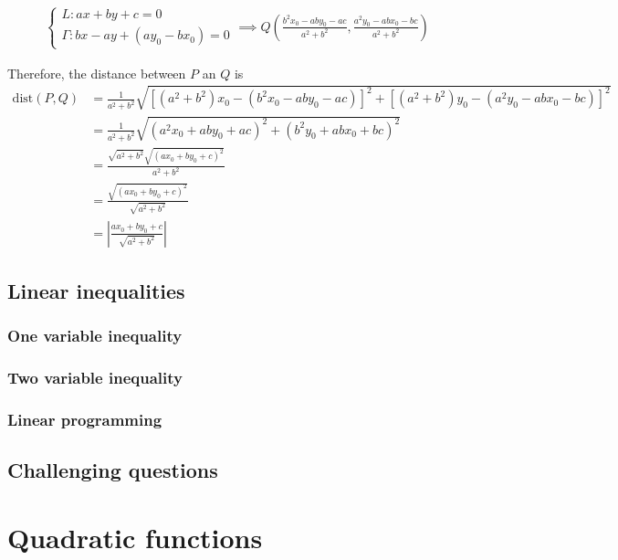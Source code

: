 \documentclass[12pt]{article}
\begin{document}
    \begin{align*}
        \begin{cases}
            L:ax+by+c=0\\
            \Gamma:bx-ay+(ay_0-bx_0)=0
        \end{cases}\implies Q(\frac{b^2x_0-aby_0-ac}{a^2+b^2},\frac{a^2y_0-abx_0-bc}{a^2+b^2})
    \end{align*}

    Therefore, the distance between $P$ an $Q$ is \begin{align*}
        \mathrm{dist}(P,Q)&=\frac{1}{a^2+b^2}\sqrt{[(a^2+b^2)x_0-(b^2x_0-aby_0-ac)]^2+[(a^2+b^2)y_0-(a^2y_0-abx_0-bc)]^2}\\
        &=\frac{1}{a^2+b^2}\sqrt{(a^2x_0+aby_0+ac)^2+(b^2y_0+abx_0+bc)^2}\\
        &=\frac{\sqrt{a^2+b^2}\sqrt{(ax_0+by_0+c)^2}}{a^2+b^2}\\
        &=\frac{\sqrt{(ax_0+by_0+c)^2}}{\sqrt{a^2+b^2}}\\
        &=\left|\frac{ax_0+by_0+c}{\sqrt{a^2+b^2}}\right|
    \end{align*}

    \subsection{Linear inequalities}

    \subsubsection*{One variable inequality}

    \subsubsection*{Two variable inequality}

    \subsubsection*{Linear programming}

    \subsection{Challenging questions}

    \newpage

    \section{Quadratic functions}
\end{document}
